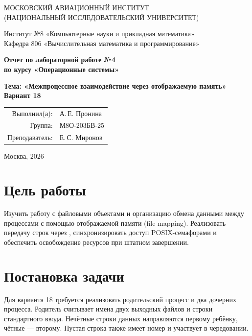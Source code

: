 \documentclass[12pt,a4paper,oneside]{article}
\newcommand{\code}[1]{\texttt{\detokenize{#1}}}
\begin{document}
\begin{titlepage}
\begin{center}
\large МОСКОВСКИЙ АВИАЦИОННЫЙ ИНСТИТУТ\\
(НАЦИОНАЛЬНЫЙ ИССЛЕДОВАТЕЛЬСКИЙ УНИВЕРСИТЕТ)
\vspace{20pt}

Институт №8 «Компьютерные науки и прикладная математика»\\
Кафедра 806 «Вычислительная математика и программирование»
\end{center}
\vspace{65pt}
\begin{center}
\large\bfseries Отчет по лабораторной работе №4\\[7pt]
по курсу «Операционные системы»
\end{center}
\vspace{40pt}
\begin{center}
\large\bfseries Тема: «Межпроцессное взаимодействие через отображаемую память»\\[7pt]
Вариант 18
\end{center}
\vfill
\begin{flushright}
\begin{tabular}{rl}
Выполнил(а): & А.\,Е. Пронина \\
Группа: & М8О-203БВ-25 \\
Преподаватель: & Е.\,С. Миронов \\
\end{tabular}
\end{flushright}
\vspace{40pt}
\begin{center}Москва, 2026\end{center}
\end{titlepage}

\section{Цель работы}
Изучить работу с файловыми объектами и организацию обмена данными между процессами с помощью отображаемой памяти (file mapping). Реализовать передачу строк через \code{mmap()}, синхронизировать доступ POSIX-семафорами и обеспечить освобождение ресурсов при штатном завершении.

\section{Постановка задачи}
Для варианта 18 требуется реализовать родительский процесс и два дочерних процесса. Родитель считывает имена двух выходных файлов и строки стандартного ввода. Нечётные строки данных направляются первому ребёнку, чётные --- второму. Пустая строка также имеет номер и участвует в чередовании.
\end{document}
